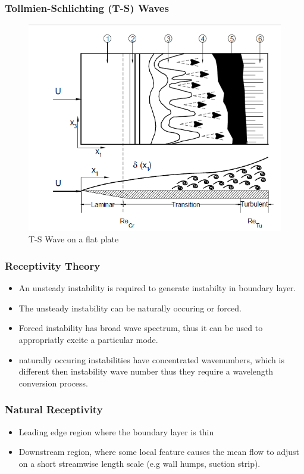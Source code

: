 \documentclass[aspectratio=149]{beamer}
\begin{document}
\begin{frame}
    \frametitle{Tollmien-Schlichting (T-S) Waves}
    \begin{figure}[h!]
      \centering
      \includegraphics[scale=0.4]{xyz.png}
      \caption{T-S Wave on a flat plate}
      \label{fig:tswave}
    \end{figure}
\end{frame}

\begin{frame}
    \frametitle{Receptivity Theory}
    \begin{itemize}
        \item An unsteady instability is required to generate instabilty in
          boundary layer.
        \item The unsteady instability can be naturally occuring or forced.
        \item Forced instability has broad wave spectrum, thus it can be
          used to appropriatly excite a particular mode.
        \item naturally occuring instabilities have concentrated
          wavenumbers, which is different then instability wave number thus
          they require a wavelength conversion process.
    \end{itemize}
\end{frame}

\begin{frame}
    \frametitle{Natural Receptivity}
    \begin{itemize}
        \item Leading edge region where the boundary layer is thin
        \item Downstream region, where some local feature causes the mean
          flow to adjust on a short streamwise length scale (e.g wall
          humps, suction strip).
    \end{itemize}
\end{frame}
\end{document}
